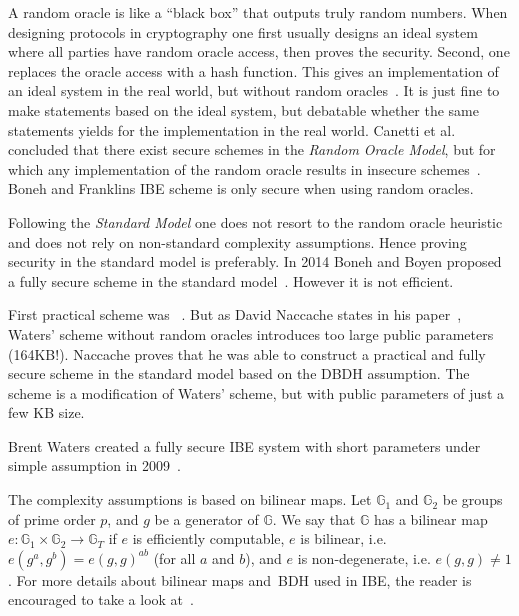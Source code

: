 A random oracle is like a ``black box'' that outputs truly random numbers.
When designing protocols in cryptography one first usually designs an ideal system where all parties have random oracle access, then proves the security.
Second, one replaces the oracle access with a hash function.
This gives an implementation of an ideal system in the real world, but without random oracles~\cite{DBLP:conf/ccs/BellareR93}. 
It is just fine to make statements based on the ideal system, but debatable whether the same statements yields for the implementation in the real world.
Canetti et al. concluded that there exist secure schemes in the \textit{Random Oracle Model}, but for which any implementation of the random oracle results in insecure schemes~\cite{DBLP:journals/jacm/CanettiGH04}.
Boneh and Franklins \gls{IBE} scheme is only secure when using random oracles.

Following the \textit{Standard Model} one does not resort to the random oracle heuristic and does not rely on non-standard complexity assumptions.
Hence proving security in the standard model is preferably.
In 2014 Boneh and Boyen proposed a fully secure scheme in the standard model~\cite{DBLP:conf/crypto/BonehB04}.
However it is not efficient. 

First practical scheme was ~\cite{DBLP:journals/iacr/Waters04}.
But as David Naccache states in his paper~\cite{DBLP:journals/iacr/Naccache05}, Waters' scheme without random oracles introduces too large public parameters (164\gls{KB}!).
Naccache proves that he was able to construct a practical and fully secure scheme in the standard model based on the \gls{DBDH} assumption.
The scheme is a modification of Waters' scheme, but with public parameters of just a few \gls{KB} size.

Brent Waters created a fully secure \gls{IBE} system with short parameters under simple assumption in 2009~\cite{DBLP:conf/crypto/Waters09}.

The complexity assumptions is based on bilinear maps.
Let $\mathbb{G}_1$ and $\mathbb{G}_2$ be groups of prime order $p$, and $g$ be a generator of $\mathbb{G}$. 
We say that $\mathbb{G}$ has a bilinear map $e : \mathbb{G}_1 \times \mathbb{G}_2 \to \mathbb{G}_T$ if $e$ is efficiently computable, $e$ is bilinear, i.e. $e(g^a, g^b) = e(g, g)^{ab}$ (for all $a$ and $b$), and $e$ is non-degenerate, i.e. $e(g,g)\neq 1$.
For more details about bilinear maps and~\gls{BDH} used in \gls{IBE}, the reader is encouraged to take a look at~\cite{DBLP:conf/crypto/BonehF01,DBLP:journals/iacr/Naccache05}.

